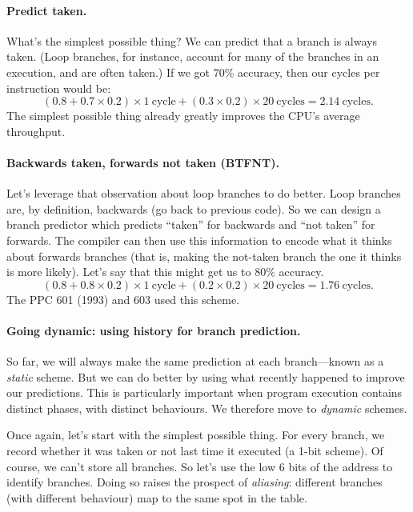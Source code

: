 \documentclass[a4paper]{report}
\begin{document}
\paragraph{Predict taken.} What's the simplest possible thing? We can
predict that a branch is always taken. (Loop branches, for instance,
account for many of the branches in an execution, and are often taken.)
If we got 70\% accuracy, then our cycles per instruction would be:
\[
(0.8 + 0.7 \times 0.2) \times 1 \mathrm{~cycle} + (0.3 \times 0.2) \times 20 \mathrm{~cycles} = 2.14 \mathrm{~cycles}.
\]
The simplest possible thing already greatly improves the CPU's average throughput.

\paragraph{Backwards taken, forwards not taken (BTFNT).}
Let's leverage that observation about loop branches to do better.
Loop branches are, by definition, backwards (go back to previous
code). So we can design a branch predictor which predicts ``taken''
for backwards and ``not taken'' for forwards. The compiler can then
use this information to encode what it thinks about forwards branches
(that is, making the not-taken branch the one it thinks is more likely).
Let's say that this might get us to 80\% accuracy. \[
(0.8 + 0.8 \times 0.2) \times 1 \mathrm{~cycle} + (0.2 \times 0.2) \times 20 \mathrm{~cycles} = 1.76 \mathrm{~cycles}.
\]
The PPC 601 (1993) and 603 used this scheme.

\paragraph{Going dynamic: using history for branch prediction.}
So far, we will always make the same prediction at each branch---known as a
\emph{static} scheme. But we can do better by using what recently happened to
improve our predictions. This is particularly important when program execution
contains distinct phases, with distinct behaviours.
We therefore move to \emph{dynamic} schemes.

Once again, let's start with the simplest possible thing. For every branch,
we record whether it was taken or not last time it executed (a 1-bit scheme).
Of course, we can't store all branches. So let's use the low 6 bits of the address
to identify branches. Doing so raises the prospect of \emph{aliasing}:
different branches (with different behaviour) map to the same spot in the table.
\end{document}
